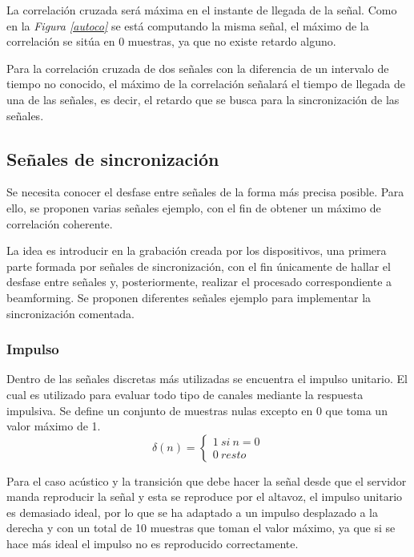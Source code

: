 \documentclass[a4paper,11pt]{book}
\begin{document}
La correlación cruzada será máxima en el instante de llegada de la señal. Como en la \textit{Figura \ref{autoco}} se está computando la misma señal, el máximo de la correlación se sitúa en 0 muestras, ya que no existe retardo alguno.

Para la correlación cruzada de dos señales con la diferencia de un intervalo de tiempo no conocido, el máximo de la correlación señalará el tiempo de llegada de una de las señales, es decir, el retardo que se busca para la sincronización de las señales.

\subsection{Señales de sincronización}
Se necesita conocer el desfase entre señales de la forma más precisa posible. Para ello, se proponen varias señales ejemplo, con el fin de obtener un máximo de correlación coherente.

La idea es introducir en la grabación creada por los dispositivos, una primera parte formada por señales de sincronización, con el fin únicamente de hallar el desfase entre señales y, posteriormente, realizar el procesado correspondiente a beamforming. Se proponen diferentes señales ejemplo para implementar la sincronización comentada.

\subsubsection{Impulso}
Dentro de las señales discretas más utilizadas se encuentra el impulso unitario. El cual es utilizado para evaluar todo tipo de canales mediante la respuesta impulsiva. Se define un conjunto de muestras nulas excepto en 0 que toma un valor máximo de 1.
\[
\delta(n)=\left\lbrace\begin{array}{c} 1~si~n = 0 \\ 0~resto \end{array}\right.\]

Para el caso acústico y la transición que debe hacer la señal desde que el servidor manda reproducir la señal y esta se reproduce por el altavoz, el impulso unitario es demasiado ideal, por lo que se ha adaptado a un impulso desplazado a la derecha y con un total de 10 muestras que toman el valor máximo, ya que si se hace más ideal el impulso no es reproducido correctamente.
\end{document}
